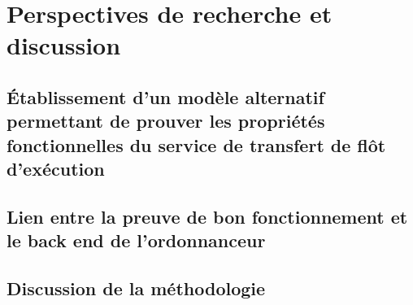 
	\section{Perspectives de recherche et discussion}
		\subsection{Établissement d'un modèle alternatif permettant de prouver les propriétés fonctionnelles du service de transfert de flôt d'exécution}
		\subsection{Lien entre la preuve de bon fonctionnement et le back end de l'ordonnanceur}
		\subsection{Discussion de la méthodologie}
